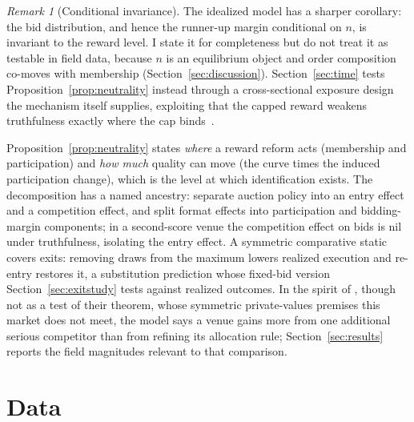 \documentclass[11pt]{article}
\theoremstyle{plain}
\theoremstyle{definition}
\theoremstyle{remark}
\newtheorem{remark}{Remark}
\begin{document}
\begin{remark}[Conditional invariance]\label{rem:invariance}
The idealized model has a sharper corollary: the bid distribution, and hence the runner-up margin conditional on $n$, is invariant to the reward level. I state it for completeness but do not treat it as testable in field data, because $n$ is an equilibrium object and order composition co-moves with membership (Section~\ref{sec:discussion}). Section~\ref{sec:time} tests Proposition~\ref{prop:neutrality} instead through a cross-sectional exposure design the mechanism itself supplies, exploiting that the capped reward weakens truthfulness exactly where the cap binds~\citep{cowdao_rewards}.
\end{remark}

Proposition~\ref{prop:neutrality} states \emph{where} a reward reform acts (membership and participation) and \emph{how much} quality can move (the curve times the induced participation change), which is the level at which identification exists. The decomposition has a named ancestry: \citet{li2009entry} separate auction policy into an entry effect and a competition effect, and \citet{athey2011open} split format effects into participation and bidding-margin components; in a second-score venue the competition effect on bids is nil under truthfulness, isolating the entry effect. A symmetric comparative static covers exits: removing draws from the maximum lowers realized execution and re-entry restores it, a substitution prediction whose fixed-bid version Section~\ref{sec:exitstudy} tests against realized outcomes. In the spirit of \citet{bulow1996auctions}, though not as a test of their theorem, whose symmetric private-values premises this market does not meet, the model says a venue gains more from one additional serious competitor than from refining its allocation rule; Section~\ref{sec:results} reports the field magnitudes relevant to that comparison.

\section{Data}
\end{document}
